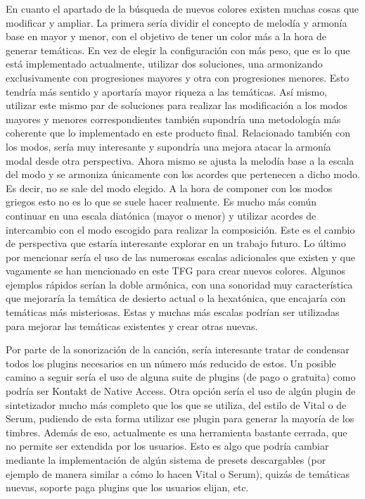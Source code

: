 En cuanto el apartado de la búsqueda de nuevos colores existen muchas cosas que modificar y ampliar. La primera sería dividir el concepto de melodía y armonía base en mayor y menor, con el objetivo de tener un color más a la hora de generar temáticas. En vez de elegir la configuración con más peso, que es lo que está implementado actualmente, utilizar dos soluciones, una armonizando exclusivamente con progresiones mayores y otra con progresiones menores. Esto tendría más sentido y aportaría mayor riqueza a las temáticas. Así mismo, utilizar este mismo par de soluciones para realizar las modificación a los modos mayores y menores correspondientes también supondría una metodología más coherente que lo implementado en este producto final. Relacionado también con los modos, sería muy interesante y supondría una mejora atacar la armonía modal desde otra perspectiva. Ahora mismo se ajusta la melodía base a la escala del modo y se armoniza únicamente con los acordes que pertenecen a dicho modo. Es decir, no se sale del modo elegido. A la hora de componer con los modos griegos esto no es lo que se suele hacer realmente. Es mucho más común continuar en una escala diatónica (mayor o menor) y utilizar acordes de intercambio con el modo escogido para realizar la composición. Este es el cambio de perspectiva que estaría interesante explorar en un trabajo futuro. Lo último por mencionar sería el uso de las numerosas escalas adicionales que existen y que vagamente se han mencionado en este TFG para crear nuevos colores. Algunos ejemplos rápidos serían la doble armónica, con una sonoridad muy característica que mejoraría la temática de desierto actual o la hexatónica, que encajaría con temáticas más misteriosas. Estas y muchas más escalas podrían ser utilizadas para mejorar las temáticas existentes y crear otras nuevas.

Por parte de la sonorización de la canción, sería interesante tratar de condensar todos los plugins necesarios en un número más reducido de estos. Un posible camino a seguir sería el uso de alguna suite de plugins (de pago o gratuita) como podría ser Kontakt de Native Access. Otra opción sería el uso de algún plugin de sintetizador mucho más completo que los que se utiliza, del estilo de Vital o de Serum, pudiendo de esta forma utilizar ese plugin para generar la mayoría de los timbres. Además de eso, actualmente es una herramienta bastante cerrada, que no permite ser extendida por los usuarios. Esto es algo que podría cambiar mediante la implementación de algún sistema de presets descargables (por ejemplo de manera similar a cómo lo hacen Vital o Serum), quizás de temáticas nuevas, soporte paga plugins que los usuarios elijan, etc. 


